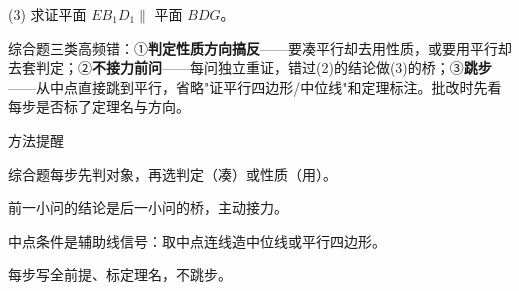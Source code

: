 \documentclass{exam-zh}
\begin{document}
\begin{eduSubQuestionItem}{(3)}
求证平面 $EB_{1}D_{1}\parallel$ 平面 $BDG$。\end{eduSubQuestionItem}

\begin{eduDualExplain}
  \begin{eduExplainLeft}
  \end{eduExplainLeft}

  \begin{eduExplainRight}
  \end{eduExplainRight}
\end{eduDualExplain}




\begin{eduMistakeBox}
综合题三类高频错：①\textbf{判定性质方向搞反}——要凑平行却去用性质，或要用平行却去套判定；②\textbf{不接力前问}——每问独立重证，错过(2)的结论做(3)的桥；③\textbf{跳步}——从中点直接跳到平行，省略"证平行四边形/中位线"和定理标注。批改时先看每步是否标了定理名与方向。
\end{eduMistakeBox}




\begin{eduSummaryBlock}{\eduIconPin}{方法提醒}
\begin{eduBulletList}
  \item 综合题每步先判对象，再选判定（凑）或性质（用）。  \item 前一小问的结论是后一小问的桥，主动接力。  \item 中点条件是辅助线信号：取中点连线造中位线或平行四边形。  \item 每步写全前提、标定理名，不跳步。\end{eduBulletList}
\end{eduSummaryBlock}
\end{document}
